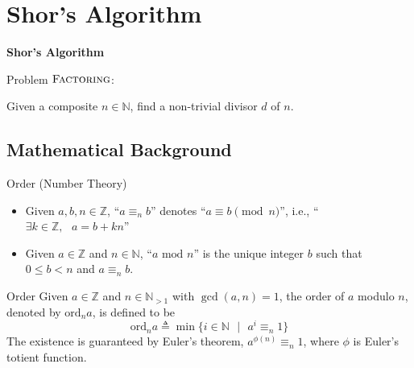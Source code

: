 \documentclass{beamer}
\newcommand{\mbb}[1]{\mathbb{#1}}
\newcommand{\mrm}[1]{\mathrm{#1}}
\renewcommand{\:}{\text{ }}
\renewcommand{\mod}{\text{ mod }}
\newcommand{\ord}[1]{\mrm{ord}_{#1}}
\begin{document}
    \section{Shor's Algorithm}
    \begin{frame}
            \begin{tcolorbox}[width=\linewidth, halign=center, colback=darkblue, boxsep=5mm, arc=3mm, boxrule=0pt]
                \centering
                \color{white} \Large
                \textbf{Shor's Algorithm} \\[1em]
                \small
                \begin{flushleft}
                    Problem $\textsc{Factoring}$:
                \end{flushleft} \vspace*{-.7em}
                Given a composite $n \in \mbb{N}$, find a non-trivial divisor $d$ of $n$.
            \end{tcolorbox}
    \end{frame}

    \subsection{Mathematical Background}
    \begin{frame}{Order (Number Theory)}
        \begin{exampleblock}{}
            \begin{itemize}
                \item Given $a, b, n \in \mbb{Z}$, ``$a \equiv_n b$'' denotes ``$a \equiv b \pmod{n}$'', i.e., ``$\exists k \in \mbb{Z},\: a = b + kn$''
                \item Given $a \in \mbb{Z}$ and $n \in \mbb{N}$, ``$a \mod n$'' is the unique integer $b$ such that $0 \leq b < n$ and $a \equiv_{n} b$.
            \end{itemize}
        \end{exampleblock}
        \begin{exampleblock}{Order}
            Given $a \in \mbb{Z}$ and $n \in \mbb{N}_{>1}$ with $\gcd (a, n) = 1$,
            the \alert{order of $a$ modulo $n$}, denoted by $\ord{n} a$, is defined to be
            \[ \ord{n} a \triangleq \min \{ i \in \mbb{N} \:|\: a^i \equiv_n 1 \} \]
            The existence is guaranteed by Euler's theorem, $a^{\phi(n)} \equiv_n 1$,
            where $\phi$ is Euler's totient function.
        \end{exampleblock}
    \end{frame}
\end{document}
